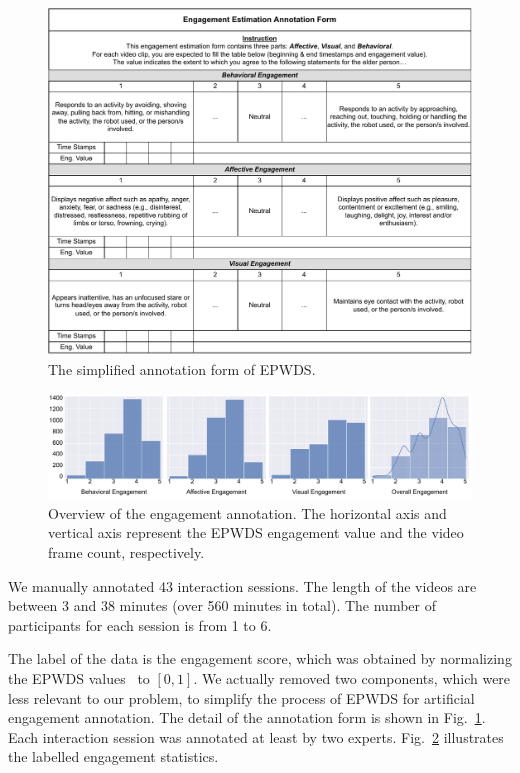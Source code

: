 \documentclass[VANCOUVER,STIX1COL]{WileyNJD-v2}
\begin{document}
\begin{figure}[t]
  \centering
  \includegraphics[width=\linewidth]{assets/annotation_form}
  \caption{The simplified annotation form of EPWDS.}
  \label{f:annotation_form}
\end{figure}

\begin{figure}[thb!]
  \centering
  \includegraphics[width=\linewidth]{assets/label_overview}
  \caption{Overview of the engagement annotation. The horizontal axis and vertical axis represent the EPWDS engagement value and the video frame count, respectively.}
  \label{f:label_overview}
\end{figure}

We manually annotated 43 interaction sessions. The length of the videos are between 3 and 38 minutes (over 560 minutes in total). The number of participants for each session is from 1 to 6.

The label of the data is the engagement score, which was obtained by normalizing the EPWDS values~\cite{Jones2018Engagement} to $[0, 1]$. We actually removed two components, which were less relevant to our problem, to simplify the process of EPWDS for artificial engagement annotation. The detail of the annotation form is shown in Fig.~\ref{f:annotation_form}. Each interaction session was annotated at least by two experts. Fig.~\ref{f:label_overview} illustrates the labelled engagement statistics.
\end{document}
